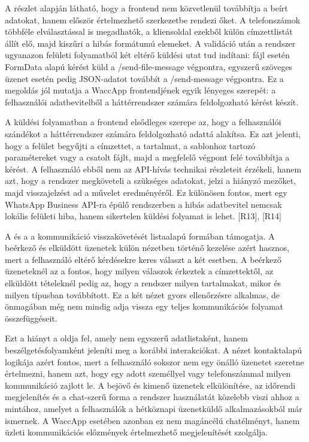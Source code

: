 A részlet alapján látható, hogy a frontend nem közvetlenül továbbítja a beírt adatokat, hanem először értelmezhető szerkezetbe rendezi őket. A telefonszámok többféle elválasztással is megadhatók, a kliensoldal ezekből külön címzettlistát állít elő, majd kiszűri a hibás formátumú elemeket. A validáció után a rendszer ugyanazon felületi folyamatból két eltérő küldési utat tud indítani: fájl esetén FormData alapú kérést küld a /send-file-message végpontra, egyszerű szöveges üzenet esetén pedig JSON-adatot továbbít a /send-message végpontra. Ez a megoldás jól mutatja a WaccApp frontendjének egyik lényeges szerepét: a felhasználói adatbevitelből a háttérrendszer számára feldolgozható kérést készít.

A küldési folyamatban a frontend elsődleges szerepe az, hogy a felhasználói szándékot a háttérrendszer számára feldolgozható adattá alakítsa. Ez azt jelenti, hogy a felület begyűjti a címzettet, a tartalmat, a sablonhoz tartozó paramétereket vagy a csatolt fájlt, majd a megfelelő végpont felé továbbítja a kérést. A felhasználó ebből nem az API-hívás technikai részleteit érzékeli, hanem azt, hogy a rendszer megköveteli a szükséges adatokat, jelzi a hiányzó mezőket, majd visszajelzést ad a művelet eredményéről. Ez különösen fontos, mert egy WhatsApp Business API-ra épülő rendszerben a hibás adatbevitel nemcsak lokális felületi hiba, hanem sikertelen küldési folyamat is lehet. [R13], [R14] 

A  és a  a kommunikáció visszakövetését listaalapú formában támogatja. A beérkező és elküldött üzenetek külön nézetben történő kezelése azért hasznos, mert a felhasználó eltérő kérdésekre keres választ a két esetben. A beérkező üzeneteknél az a fontos, hogy milyen válaszok érkeztek a címzettektől, az elküldött tételeknél pedig az, hogy a rendszer milyen tartalmakat, mikor és milyen típusban továbbított. Ez a két nézet gyors ellenőrzésre alkalmas, de önmagában még nem mindig adja vissza egy teljes kommunikációs folyamat összefüggéseit. 

Ezt a hiányt a  oldja fel, amely nem egyszerű adatlistaként, hanem beszélgetésfolyamként jeleníti meg a korábbi interakciókat. A nézet kontaktalapú logikája azért fontos, mert a felhasználó sokszor nem egy önálló üzenetet szeretne értelmezni, hanem azt, hogy egy adott személlyel vagy telefonszámmal milyen kommunikáció zajlott le. A bejövő és kimenő üzenetek elkülönítése, az időrendi megjelenítés és a chat-szerű forma a rendszer használatát közelebb viszi ahhoz a mintához, amelyet a felhasználók a hétköznapi üzenetküldő alkalmazásokból már ismernek. A WaccApp esetében azonban ez nem magáncélú chatélményt, hanem üzleti kommunikációs előzmények értelmezhető megjelenítését szolgálja. 

